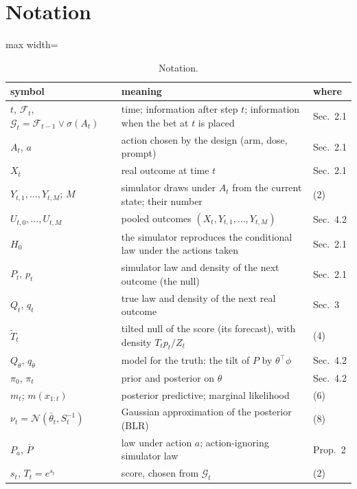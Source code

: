 \documentclass[11pt]{article}
\newcommand{\F}{\mathcal{F}}
\newcommand{\G}{\mathcal{G}}
\theoremstyle{remark}
\begin{document}


\clearpage
\section{Notation}\label{app:notation}


\begin{table}[H]
\centering
\caption{Notation. }
\label{tab:notation}
\begin{adjustbox}{max width=\textwidth}
\begin{tabular}{lll}
\toprule
symbol & meaning & where \\
\midrule
$t$, $\F_t$, $\G_t = \F_{t-1} \vee \sigma(A_t)$ & time; information after step $t$; information when the bet at $t$ is placed & Sec.~2.1 \\
$A_t$, $a$ & action chosen by the design (arm, dose, prompt) & Sec.~2.1 \\
$X_t$ & real outcome at time $t$ & Sec.~2.1 \\
$Y_{t,1}, \ldots, Y_{t,M}$; $M$ & simulator draws under $A_t$ from the current state; their number & (2) \\
$U_{t,0}, \ldots, U_{t,M}$ & pooled outcomes $(X_t, Y_{t,1}, \ldots, Y_{t,M})$ & Sec.~4.2 \\
$H_0$ & the simulator reproduces the conditional law under the actions taken & Sec.~2.1 \\
\midrule
$P_t$, $p_t$ & simulator law and density of the next outcome (the null) & Sec.~2.1 \\
$Q_t$, $q_t$ & true law and density of the next real outcome & Sec.~3 \\
$\tilde T_t$ & tilted null of the score (its forecast), with density $T_t p_t / Z_t$ & (4) \\
$Q_\theta$, $q_\theta$ & model for the truth: the tilt of $P$ by $\theta^\top\phi$ & Sec.~4.2 \\
$\pi_0$, $\pi_t$ & prior and posterior on $\theta$ & Sec.~4.2 \\
$m_t$; $m(x_{1:t})$ & posterior predictive; marginal likelihood & (6) \\
$\nu_t = \mathcal N(\bar\theta_t, S_t^{-1})$ & Gaussian approximation of the posterior (BLR) & (8) \\
$P_a$, $\bar P$ & law under action $a$; action-ignoring simulator law & Prop.~2 \\
\midrule
$s_t$, $T_t = e^{s_t}$ & score, chosen from $\G_t$ & (2) \\

\end{tabular}
\end{adjustbox}
\end{table}
\end{document}
